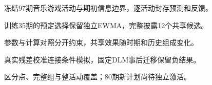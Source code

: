 \begin{highlights}
\item 冻结97期音乐游戏活动与期初信息边界，逐活动封存预测和反馈。
\item 训练35期的预定选择保留独立EWMA，完整披露12个共享候选。
\item 参数与计算对照分开约束，共享效果随时期和历史组成变化。
\item 真实残差校准连接条件模拟，固定DLM事后迁移保留负结果。
\item 区分点、完整组与整活动覆盖；80期新计划尚待独立激活。
\end{highlights}
